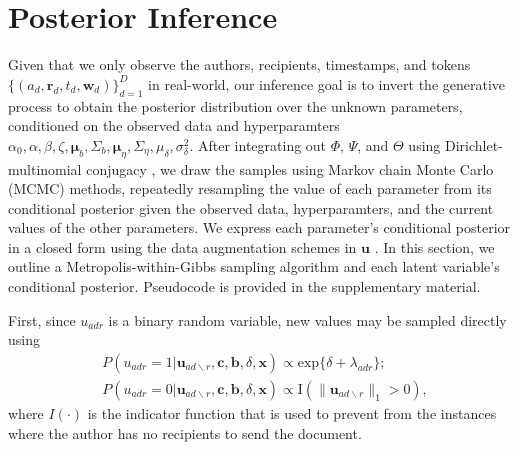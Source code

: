 \documentclass{article}
\begin{document}
\section{Posterior Inference}\label{sec:Inference}
Given that we only observe the authors, recipients, timestamps, and tokens $ \{ (a_d, \boldsymbol{r}_d, t_d,  \boldsymbol{w}_d)\}_{d=1}^D$ in real-world, our inference goal is to invert the generative process to obtain the posterior distribution over the unknown parameters, conditioned on the observed data and hyperparamters $\alpha_0, \alpha, \beta, \zeta, \boldsymbol{\mu}_b, \Sigma_b, \boldsymbol{\mu}_\eta, \Sigma_\eta, {\mu}_\delta,\sigma^2_\delta$. After integrating out $\Phi$, $\Psi$, and $\Theta$ using Dirichlet-multinomial conjugacy \cite{griffiths2004finding}, we draw the samples using Markov chain Monte Carlo (MCMC) methods, repeatedly resampling the value of each parameter from its conditional posterior given the observed data, hyperparamters, and the current values of the other parameters. We express each parameter’s conditional posterior in a closed form using the data augmentation schemes in $\boldsymbol{u}$ \cite{tanner1987calculation}. In this section, we outline a Metropolis-within-Gibbs sampling algorithm and each latent variable's conditional posterior. Pseudocode is provided in the supplementary material.

First, since $u_{adr}$ is a binary random variable, new values may be sampled directly using
\begin{equation}
\begin{aligned}
&P(u_{adr}=1| \boldsymbol{u}_{ad\backslash r}, \boldsymbol{c},\boldsymbol{b}, \delta, \boldsymbol{x})
\propto \mbox{exp}\{\delta+\lambda_{adr}\};\\
&P(u_{adr}=0| \boldsymbol{u}_{ad\backslash r}, \boldsymbol{c},\boldsymbol{b}, \delta, \boldsymbol{x})\propto \text{I}(\lVert\boldsymbol{u}_{ad\backslash r}\rVert_1 > 0 ),
\end{aligned}
\label{eqn:latentreceiver}
\end{equation}
where $I(\cdot)$ is the indicator function that is used to prevent from the instances where the author has no recipients to send the document.
\end{document}
